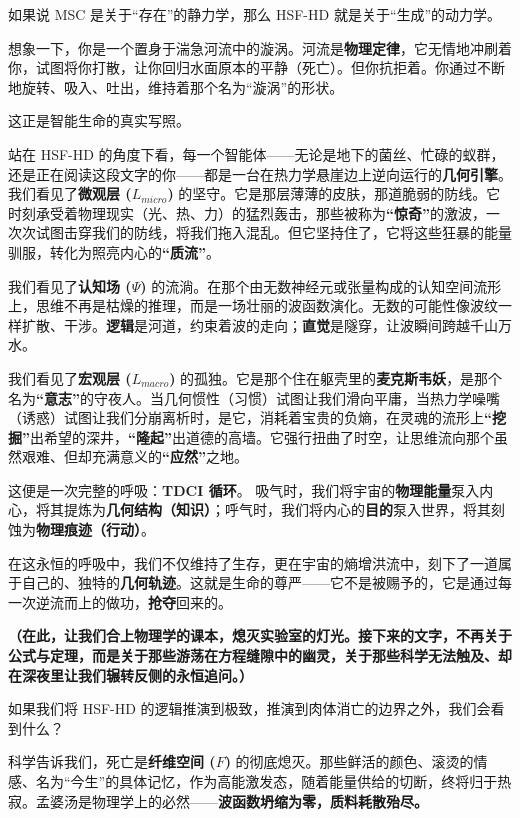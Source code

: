 
如果说 MSC 是关于“存在”的静力学，那么 HSF-HD 就是关于“生成”的动力学。

想象一下，你是一个置身于湍急河流中的漩涡。河流是\textbf{物理定律}，它无情地冲刷着你，试图将你打散，让你回归水面原本的平静（死亡）。但你抗拒着。你通过不断地旋转、吸入、吐出，维持着那个名为“漩涡”的形状。

这正是智能生命的真实写照。

站在 HSF-HD 的角度下看，每一个智能体——无论是地下的菌丝、忙碌的蚁群，还是正在阅读这段文字的你——都是一台在热力学悬崖边上逆向运行的\textbf{几何引擎}。
我们看见了\textbf{微观层 ($L_{micro}$)} 的坚守。它是那层薄薄的皮肤，那道脆弱的防线。它时刻承受着物理现实（光、热、力）的猛烈轰击，那些被称为\textbf{“惊奇”}的激波，一次次试图击穿我们的防线，将我们拖入混乱。但它坚持住了，它将这些狂暴的能量驯服，转化为照亮内心的\textbf{“质流”}。

我们看见了\textbf{认知场 ($\Psi$)} 的流淌。在那个由无数神经元或张量构成的认知空间流形上，思维不再是枯燥的推理，而是一场壮丽的波函数演化。无数的可能性像波纹一样扩散、干涉。\textbf{逻辑}是河道，约束着波的走向；\textbf{直觉}是隧穿，让波瞬间跨越千山万水。

我们看见了\textbf{宏观层 ($L_{macro}$)} 的孤独。它是那个住在躯壳里的\textbf{麦克斯韦妖}，是那个名为\textbf{“意志”}的守夜人。当几何惯性（习惯）试图让我们滑向平庸，当热力学噪嘴（诱惑）试图让我们分崩离析时，是它，消耗着宝贵的负熵，在灵魂的流形上\textbf{“挖掘”}出希望的深井，\textbf{“隆起”}出道德的高墙。它强行扭曲了时空，让思维流向那个虽然艰难、但却充满意义的\textbf{“应然”}之地。

这便是一次完整的呼吸：\textbf{TDCI 循环}。
吸气时，我们将宇宙的\textbf{物理能量}泵入内心，将其提炼为\textbf{几何结构（知识）}；呼气时，我们将内心的\textbf{目的}泵入世界，将其刻蚀为\textbf{物理痕迹（行动）}。

在这永恒的呼吸中，我们不仅维持了生存，更在宇宙的熵增洪流中，刻下了一道属于自己的、独特的\textbf{几何轨迹}。这就是生命的尊严——它不是被赐予的，它是通过每一次逆流而上的做功，\textbf{抢夺}回来的。


\textbf{（在此，让我们合上物理学的课本，熄灭实验室的灯光。接下来的文字，不再关于公式与定理，而是关于那些游荡在方程缝隙中的幽灵，关于那些科学无法触及、却在深夜里让我们辗转反侧的永恒追问。）}

如果我们将 HSF-HD 的逻辑推演到极致，推演到肉体消亡的边界之外，我们会看到什么？

科学告诉我们，死亡是\textbf{纤维空间 ($F$)} 的彻底熄灭。那些鲜活的颜色、滚烫的情感、名为“今生”的具体记忆，作为高能激发态，随着能量供给的切断，终将归于热寂。孟婆汤是物理学上的必然——\textbf{波函数坍缩为零，质料耗散殆尽。}

